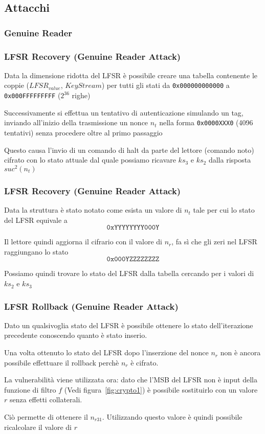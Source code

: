 \subsection{Attacchi}
\subsubsection{Genuine Reader}
\begin{frame}
    \frametitle{LFSR Recovery (Genuine Reader Attack)}
    Data la dimensione ridotta del LFSR è possibile creare una tabella contenente le coppie ($LFSR_{value}$, $KeyStream$) per tutti gli stati da \texttt{0x000000000000} a \texttt{0x000FFFFFFFFF} ($2^{36}$ righe)\pause

    Successivamente si effettua un tentativo di autenticazione simulando un tag, inviando all'inizio della trasmissione un nonce $n_t$ nella forma \texttt{0x0000XXX0} (4096 tentativi) senza procedere oltre al primo passaggio\pause
    
    Questo causa l'invio di un comando di halt da parte del lettore (comando noto) cifrato con lo stato attuale dal quale possiamo ricavare $ks_3$ e $ks_2$ dalla risposta $suc^2(n_t)$
\end{frame}
\begin{frame}
    \frametitle{LFSR Recovery (Genuine Reader Attack)}
    Data la struttura è stato notato come esista un valore di $n_t$ tale per cui lo stato del LFSR equivale a \[\texttt{0xYYYYYYYY000Y}\]\pause

    Il lettore quindi aggiorna il cifrario con il valore di $n_r$, fa sì che gli zeri nel LFSR raggiungano lo stato \[\texttt{0x000YZZZZZZZZ}\]\pause

    Possiamo quindi trovare lo stato del LFSR dalla tabella cercando per i valori di $ks_2$ e $ks_3$
\end{frame}

\begin{frame}
    \frametitle{LFSR Rollback (Genuine Reader Attack)}
    Dato un qualsivoglia stato del LFSR è possibile ottenere lo stato dell'iterazione precedente conoscendo quanto è stato inserio.
    \pause

    Una volta ottenuto lo stato del LFSR dopo l'inserzione del nonce $n_r$ non è ancora possibile effettuare il rollback perchè $n_r$ è cifrato.
    \pause
    
    La vulnerabilità viene utilizzata ora: dato che l'MSB del LFSR non è input della funzione di filtro $f$ (Vedi figura~\ref{fig:crypto1})
    è possibile sostituirlo con un valore $r$ senza effetti collaterali.
    \pause
    
    Ciò permette di ottenere il $n_{r31}$.
    Utilizzando questo valore è quindi possibile ricalcolare il valore di $r$
\end{frame}

